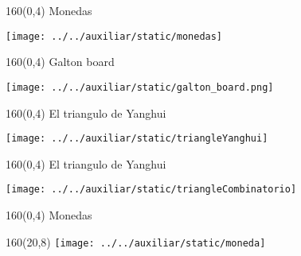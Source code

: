 \documentclass[shownotes,aspectratio=169]{beamer}
\begin{document}
\begin{frame}[plain]
 \begin{textblock}{160}(0,4)
  \centering \LARGE Monedas
 \end{textblock}

 \vspace{1cm}

\texttt{[image: ../../auxiliar/static/monedas]} 
 
\end{frame}

\begin{frame}[plain]
 \begin{textblock}{160}(0,4)
  \centering \LARGE Galton board
 \end{textblock}

 \vspace{1cm}

 \centering
\texttt{[image: ../../auxiliar/static/galton\_board.png]} 
 
\end{frame}

\begin{frame}[plain]
 \begin{textblock}{160}(0,4)
  \centering \LARGE El triangulo de Yanghui
 \end{textblock}

\vspace{1cm}

\centering
\texttt{[image: ../../auxiliar/static/triangleYanghui]}

\end{frame}

\begin{frame}[plain]
 \begin{textblock}{160}(0,4)
  \centering \LARGE El triangulo de Yanghui
 \end{textblock}

\vspace{1cm}

\centering
\texttt{[image: ../../auxiliar/static/triangleCombinatorio]}

 
\end{frame}


\begin{frame}[plain]
 \begin{textblock}{160}(0,4)
  \centering \LARGE Monedas
 \end{textblock}

 \begin{textblock}{160}(20,8)
\texttt{[image: ../../auxiliar/static/moneda]}  
 \end{textblock}

\end{frame}
\end{document}
